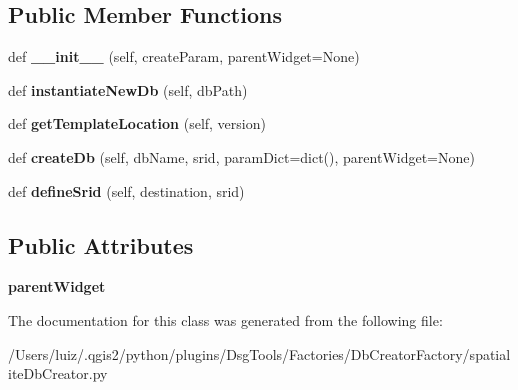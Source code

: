 \subsection*{Public Member Functions}
\begin{DoxyCompactItemize}
\item 
\mbox{\label{class_dsg_tools_1_1_factories_1_1_db_creator_factory_1_1spatialite_db_creator_1_1_spatialite_db_creator_ab56bfc9298d3fab9c6a2c23e3e579ad5}} 
def {\bfseries \+\_\+\+\_\+init\+\_\+\+\_\+} (self, create\+Param, parent\+Widget=None)
\item 
\mbox{\label{class_dsg_tools_1_1_factories_1_1_db_creator_factory_1_1spatialite_db_creator_1_1_spatialite_db_creator_abbb6617d2cce4a886c79ecfc74fc6681}} 
def {\bfseries instantiate\+New\+Db} (self, db\+Path)
\item 
\mbox{\label{class_dsg_tools_1_1_factories_1_1_db_creator_factory_1_1spatialite_db_creator_1_1_spatialite_db_creator_a6ae6a6e534dc9f9a9066811c03d35b58}} 
def {\bfseries get\+Template\+Location} (self, version)
\item 
\mbox{\label{class_dsg_tools_1_1_factories_1_1_db_creator_factory_1_1spatialite_db_creator_1_1_spatialite_db_creator_a0135e1ddc26b1879e979c30ddc816f8c}} 
def {\bfseries create\+Db} (self, db\+Name, srid, param\+Dict=dict(), parent\+Widget=None)
\item 
\mbox{\label{class_dsg_tools_1_1_factories_1_1_db_creator_factory_1_1spatialite_db_creator_1_1_spatialite_db_creator_afc498a8a71eecab7f8fe8d46c1b9968e}} 
def {\bfseries define\+Srid} (self, destination, srid)
\end{DoxyCompactItemize}
\subsection*{Public Attributes}
\begin{DoxyCompactItemize}
\item 
\mbox{\label{class_dsg_tools_1_1_factories_1_1_db_creator_factory_1_1spatialite_db_creator_1_1_spatialite_db_creator_af1e40a73c4604002605ad34b27c3fa0c}} 
{\bfseries parent\+Widget}
\end{DoxyCompactItemize}


The documentation for this class was generated from the following file\+:\begin{DoxyCompactItemize}
\item 
/\+Users/luiz/.\+qgis2/python/plugins/\+Dsg\+Tools/\+Factories/\+Db\+Creator\+Factory/spatialite\+Db\+Creator.\+py\end{DoxyCompactItemize}
